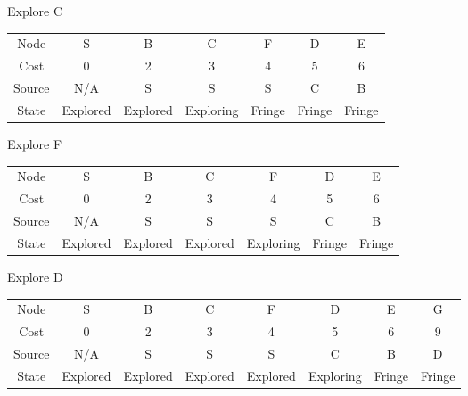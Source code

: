 \documentclass{article}
\begin{document}
\begin{enumerate}
        
        Explore C
        \newline
        \begin{left}
            \begin{tabular}{c|c|c|c|c|c|c}
            \hline
                Node & S & B & C & F & D & E\\
                Cost & 0 & 2 & 3 & 4 & 5 & 6\\
                Source & N/A & S & S & S & C & B \\
                State & Explored & Explored & Exploring & Fringe & Fringe & Fringe\\
            \hline
            \end{tabular}
        \end{left}
        \newline
        \newline
        
        
        Explore F
        \newline
        \begin{left}
            \begin{tabular}{c|c|c|c|c|c|c}
            \hline
                Node & S & B & C & F & D & E\\
                Cost & 0 & 2 & 3 & 4 & 5 & 6\\
                Source & N/A & S & S & S & C & B \\
                State & Explored & Explored & Explored & Exploring & Fringe & Fringe\\
            \hline
            \end{tabular}
        \end{left}
        \newline
        \newline
        
        
        Explore D
        \newline
        \begin{left}
            \begin{tabular}{c|c|c|c|c|c|c|c}
            \hline
                Node & S & B & C & F & D & E & G\\
                Cost & 0 & 2 & 3 & 4 & 5 & 6 & 9\\
                Source & N/A & S & S & S & C & B & D\\
                State & Explored & Explored & Explored & Explored & Exploring & Fringe & Fringe\\
            \hline
            \end{tabular}
        \end{left}
        \newline
        \newline
        

\end{enumerate}
\end{document}
